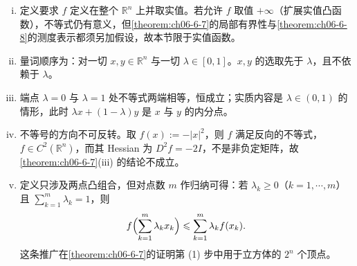 \documentclass[../../main.tex]{subfiles}%
\begin{document}
\begin{remark}\label{remark:ch06-def-6-3-条件}
\begin{enumerate}[(i)]
\item 定义要求 $f$ 定义在整个 $\mathbb{R}^n$ 上并取实值。若允许 $f$ 取值 $+\infty$（扩展实值凸函数），不等式仍有意义，但\cref{theorem:ch06-6-7}的局部有界性与\cref{theorem:ch06-6-8}的测度表示都须另加假设，故本节限于实值函数。%
\item 量词顺序为：对一切 $x,y\in\mathbb{R}^n$ 与一切 $\lambda\in[0,1]$。$x,y$ 的选取先于 $\lambda$，且不依赖于 $\lambda$。
\item 端点 $\lambda=0$ 与 $\lambda=1$ 处不等式两端相等，恒成立；实质内容是 $\lambda\in(0,1)$ 的情形，此时 $\lambda x+(1-\lambda)y$ 是 $x$ 与 $y$ 的内分点。
\item 不等号的方向不可反转。取 $f(x):=-\lvert x\rvert^{2}$，则 $f$ 满足反向的不等式，$f\in C^{2}(\mathbb{R}^n)$，而其 Hessian 为 $D^{2}f=-2I$，不是非负定矩阵，故\cref{theorem:ch06-6-7}(iii) 的结论不成立。%
\item 定义只涉及两点凸组合，但对点数 $m$ 作归纳可得：若 $\lambda_k\geqslant0$（$k=1,\cdots,m$）且 $\sum_{k=1}^{m}\lambda_k=1$，则
\begin{align*}
f\Bigl(\sum_{k=1}^{m}\lambda_kx_k\Bigr)\leqslant\sum_{k=1}^{m}\lambda_kf(x_k).
\end{align*}
这条推广在\cref{theorem:ch06-6-7}的证明第 (1) 步中用于立方体的 $2^{n}$ 个顶点。%
\end{enumerate}
\end{remark}
\end{document}
